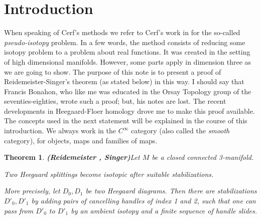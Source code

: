 \documentclass[12pt]{amsart}
\newtheorem{thm}{Theorem}[section]
\def\nd{\noindent}
\begin{document}
\section{Introduction}\label{intro}
\medskip
When speaking of Cerf's methods %
we refer to Cerf's  work %
in \cite{cerf} for the so-called 
{\it pseudo-isotopy}
problem. In a few words, the method consists of reducing  some 
isotopy problem to  a problem about real functions. It was created
 in the setting of high dimensional manifolds. However, some parts 
apply in dimension three as we are going to show. The purpose of this note is to present a proof 
of Reidemeister-Singer's theorem (as stated below) in this way.
I should say that Francis Bonahon, who like me  was educated 
in the Orsay Topology group of the seventies-eighties, wrote such a proof; 
but,  his notes are lost. The recent developments in Heegaard-Floer homology
drove me to make this proof available.
The concepts used in the next statement will be   explained in the course of  this introduction.
We always work in the $C^\infty$ category (also called the {\it smooth} category),
 for objects, maps and families of maps.
\begin{thm}{\bf (Reidemeister \cite{reidemeister}, Singer\cite{singer})}\label{r-s}
Let $M$ be a closed connected 3-manifold. 

\nd {\rm 1)} Two Heegaard splittings %
become isotopic after suitable stabilizations.
 
\nd {\rm 2)} More precisely, let $D_0, D_1$ be
 two Heegaard diagrams.  %
 Then there are stabilizations $D'_0,D'_1$
by adding pairs of cancelling handles of index 1 and 2,
such that one can pass from $D'_0$ to $D'_1$ by an ambient isotopy and  a finite sequence 
of  handle slides.\\
\end{thm} 
\end{document}
